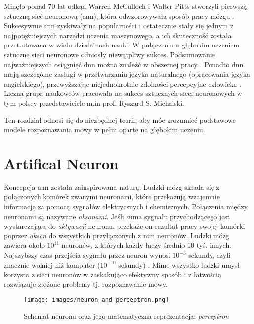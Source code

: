 Minęło ponad 70 lat odkąd Warren McCulloch i Walter Pitts stworzyli pierwszą sztuczną sieć neuronową (\acrshort{ann}), która odwzorowywała sposób pracy mózgu \cite{dnn_first}. Sukcesywnie \acrshort{ann} zyskiwały na popularności i ostatecznie stały się jednym z najpotężniejszych narzędzi uczenia maszynowego, a ich skuteczność została przetestowana w wielu dziedzinach nauki. W połączeniu z głębokim uczeniem sztuczne sieci neuronowe odniosły niewątpliwy sukces. Podsumowanie najważniejszych osiągnięć \acrshort{dnn} można znaleźć w obszernej pracy \cite{dnn_overview}. Ponadto \acrshort{dnn} mają szczególne zasługi w przetwarzaniu języka naturalnego (opracowania języka angielskiego), przewyższając niejednokrotnie zdolności percepcyjne człowieka \cite{ds2, ds3_top1, ds3_top2}. Liczna grupa naukowców pracowała na sukces sztucznych sieci neuronowych w tym polscy przedstawiciele m.in prof. Ryszard S. Michalski. 

Ten rozdział odnosi się do niezbędnej teorii, aby móc zrozumieć podstawowe modele rozpoznawania mowy w pełni oparte na głębokim uczeniu. 

\section{Artifical Neuron}
Koncepcja \acrshort{ann} została zainspirowana naturą. Ludzki mózg składa się z połączonych komórek zwanymi neuronami, które przekazują wzajemnie informację za pomocą sygnałów elektrycznych i chemicznych. Połączenia między neuronami są nazywane \textit{aksonami}. Jeśli suma sygnału przychodzącego jest wystarczająca do \textit{aktywacji} neuronu, przekaże on rezultat pracy swojej komórki poprzez \textit{akson} do wszystkich przyłączonych z nim neuronów. Ludzki mózg zawiera około $10^{11}$ neuronów, z których każdy łączy średnio 10 tyś. innych. Najszybszy czas przejścia sygnału przez neuron wynosi $10^{-3}$ sekundy, czyli znacznie wolniej niż komputer ($10^{-10}$ sekundy) \cite{ml_book}. Mimo wszystko ludzki umysł korzysta z sieci neuronów w zaskakująco efektywny sposób i z łatwością rozwiązuje złożone problemy tj. rozpoznawanie mowy. 
\begin{figure}[ht]
    \centering
    \texttt{[image: images/neuron\_and\_perceptron.png]}
    \caption{Schemat neuronu oraz jego matematyczna reprezentacja: \textit{perceptron} \cite{cs231n}}
    \label{fig:perceptron}
\end{figure}

